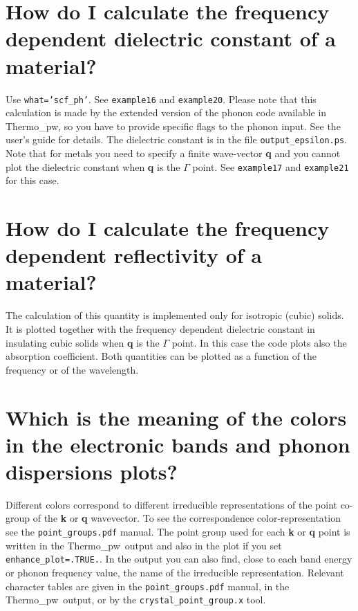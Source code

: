 \documentclass[12pt,a4paper,twoside]{report}
\def\thermo{{\sc Thermo}\_{\sc pw}}
\begin{document}
\newpage
{\color{coral}\section{How do I calculate the frequency dependent dielectric
constant of a material?}}
\color{black}
Use \texttt{what='scf\_ph'}. See \texttt{example16} and \texttt{example20}. 
Please note that this calculation is made by the extended version of the
phonon code available in \thermo, so you have to provide specific flags
to the phonon input. See the user's guide for details. 
The dielectric constant is in the file \texttt{output\_epsilon.ps}.
Note that for metals you need to specify a finite wave-vector {\bf q} and you 
cannot plot the dielectric constant when {\bf q} is the $\Gamma$ point.  
See \texttt{example17} and \texttt{example21} for this case. 

\newpage
{\color{coral}\section{How do I calculate the frequency dependent 
reflectivity of a material?}}
\color{black}
The calculation of this quantity is implemented only for isotropic 
(cubic) solids. It is plotted together with the frequency dependent 
dielectric constant in insulating cubic solids when {\bf q} is 
the $\Gamma$ point. In this case the code plots also the 
absorption coefficient. Both quantities can be plotted as a function of
the frequency or of the wavelength.

\newpage
{\color{coral}\section{Which is the meaning of the colors in
the electronic bands and phonon dispersions plots?}}
\color{black}
Different colors correspond to different irreducible representations of 
the point co-group of the {\bf k} or {\bf q} wavevector. To see the
correspondence color-representation see the \texttt{point\_groups.pdf} 
manual. The point group used for each {\bf k} or {\bf q} point is
written in the \thermo\ output and also in the plot if you set
\texttt{enhance\_plot=.TRUE.}. In the output you can also find,
close to each band energy or phonon frequency value, the name of the
irreducible representation. Relevant character tables are given in the
\texttt{point\_groups.pdf} manual, in the \thermo\ output, or by the
\texttt{crystal\_point\_group.x} tool.
\end{document}

